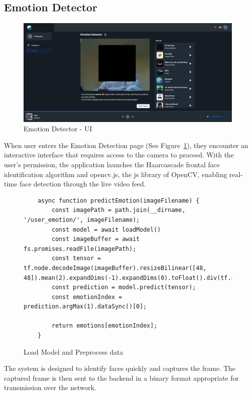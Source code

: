 \subsection{Emotion Detector}
\begin{figure}[H]
    \centering
    \includegraphics[width=14cm]{Images/emotion-detector.png}
    \caption{Emotion Detector - UI}
    \label{fig:emo-detect}
\end{figure}
When user enters the Emotion Detection page (See Figure~\ref{fig:emo-detect}), they encounter an interactive interface that requires access to the camera to proceed.
With the user's permission, the application launches the Haarcascade frontal face identification algorithm and opencv.js, the \gls{js} library of OpenCV, enabling real-time face detection through the live video feed.
\\
\begin{figure}[H] 
    \centering
\begin{verbatim}
    async function predictEmotion(imageFilename) {
        const imagePath = path.join(__dirname, '/user_emotion/', imageFilename);
        const model = await loadModel()
        const imageBuffer = await fs.promises.readFile(imagePath);
        const tensor = tf.node.decodeImage(imageBuffer).resizeBilinear([48, 48]).mean(2).expandDims(-1).expandDims(0).toFloat().div(tf.scalar(255));
        const prediction = model.predict(tensor);
        const emotionIndex = prediction.argMax(1).dataSync()[0];

        return emotions[emotionIndex];
    }
\end{verbatim}
    \caption{Load Model and Preprocess data}
    \label{fig:load-process}
\end{figure}
\indent The system is designed to identify faces quickly and captures the frame.
The captured frame is then sent to the backend in a binary format appropriate for transmission over the network.
